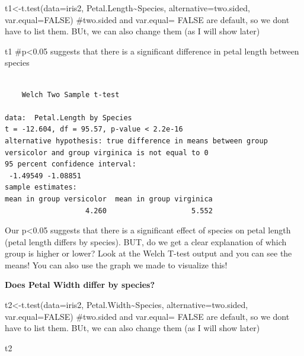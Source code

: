 \documentclass[
  letterpaper,
  DIV=11,
  numbers=noendperiod]{scrartcl}
\newenvironment{Shaded}{\begin{snugshade}}{\end{snugshade}}
\newcommand{\AttributeTok}[1]{\textcolor[rgb]{0.40,0.45,0.13}{#1}}
\newcommand{\CommentTok}[1]{\textcolor[rgb]{0.37,0.37,0.37}{#1}}
\newcommand{\ConstantTok}[1]{\textcolor[rgb]{0.56,0.35,0.01}{#1}}
\newcommand{\FunctionTok}[1]{\textcolor[rgb]{0.28,0.35,0.67}{#1}}
\newcommand{\NormalTok}[1]{\textcolor[rgb]{0.00,0.23,0.31}{#1}}
\newcommand{\OtherTok}[1]{\textcolor[rgb]{0.00,0.23,0.31}{#1}}
\newcommand{\SpecialCharTok}[1]{\textcolor[rgb]{0.37,0.37,0.37}{#1}}
\newcommand{\StringTok}[1]{\textcolor[rgb]{0.13,0.47,0.30}{#1}}
\begin{document}
\begin{Shaded}
\begin{Highlighting}[]
\NormalTok{t1}\OtherTok{\textless{}{-}}\FunctionTok{t.test}\NormalTok{(}\AttributeTok{data=}\NormalTok{iris2, Petal.Length}\SpecialCharTok{\textasciitilde{}}\NormalTok{Species, }\AttributeTok{alternative=}\StringTok{\textquotesingle{}two.sided\textquotesingle{}}\NormalTok{, }\AttributeTok{var.equal=}\ConstantTok{FALSE}\NormalTok{) }\CommentTok{\#two.sided and var.equal= FALSE are default, so we don\textquotesingle{}t have to list them. BUt, we can also change them (as I will show later)}

\NormalTok{t1 }\CommentTok{\#p\textless{}0.05 suggests that there is a significant difference in petal length between species}
\end{Highlighting}
\end{Shaded}

\begin{verbatim}

    Welch Two Sample t-test

data:  Petal.Length by Species
t = -12.604, df = 95.57, p-value < 2.2e-16
alternative hypothesis: true difference in means between group versicolor and group virginica is not equal to 0
95 percent confidence interval:
 -1.49549 -1.08851
sample estimates:
mean in group versicolor  mean in group virginica 
                   4.260                    5.552 
\end{verbatim}

\hfill\break
Our p\textless0.05 suggests that there is a significant effect of
species on petal length (petal length differs by species). BUT, do we
get a clear explanation of which group is higher or lower? Look at the
Welch T-test output and you can see the means! You can also use the
graph we made to visualize this!

\textbf{Does Petal Width differ by species?}

\begin{Shaded}
\begin{Highlighting}[]
\NormalTok{t2}\OtherTok{\textless{}{-}}\FunctionTok{t.test}\NormalTok{(}\AttributeTok{data=}\NormalTok{iris2, Petal.Width}\SpecialCharTok{\textasciitilde{}}\NormalTok{Species, }\AttributeTok{alternative=}\StringTok{\textquotesingle{}two.sided\textquotesingle{}}\NormalTok{, }\AttributeTok{var.equal=}\ConstantTok{FALSE}\NormalTok{) }\CommentTok{\#two.sided and var.equal= FALSE are default, so we don\textquotesingle{}t have to list them. BUt, we can also change them (as I will show later)}

\NormalTok{t2}
\end{Highlighting}
\end{Shaded}
\end{document}
